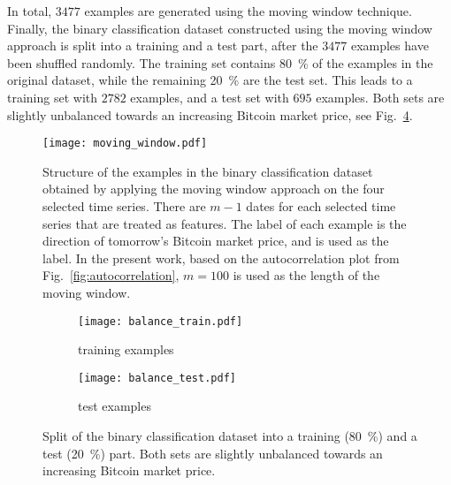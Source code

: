 In total, $3477$ examples are generated using the moving window technique. \\

Finally, the binary classification dataset constructed using the moving window approach is split into a training and a test part, after the $3477$ examples have been shuffled randomly. The training set contains \SI{80}{\percent} of the examples in the original dataset, while the remaining \SI{20}{\percent} are the test set. This leads to a training set with $2782$ examples, and a test set with $695$ examples. Both sets are slightly unbalanced towards an increasing Bitcoin market price, see Fig.~\ref{fig:test}.

\begin{figure}[h!]
	\centering
	\texttt{[image: moving\_window.pdf]}
    \caption{Structure of the examples in the binary classification dataset obtained by applying the moving window approach on the four selected time series. There are $m-1$ dates for each selected time series that are treated as features. The label of each example is the direction of tomorrow's Bitcoin market price, and is used as the label. In the present work, based on the autocorrelation plot from Fig.~\ref{fig:autocorrelation}, $m=100$ is used as the length of the moving window.}
    \label{fig:example}
\end{figure}

\begin{figure}[h!]
\centering
\begin{subfigure}{.5\textwidth}
  \centering
  \texttt{[image: balance\_train.pdf]}
  \caption{training examples}
  \label{fig:sub1}
\end{subfigure}%
\begin{subfigure}{.5\textwidth}
  \centering
  \texttt{[image: balance\_test.pdf]}
  \caption{test examples}
  \label{fig:sub2}
\end{subfigure}
\caption{Split of the binary classification dataset into a training (\SI{80}{\percent}) and a test (\SI{20}{\percent}) part. Both sets are slightly unbalanced towards an increasing Bitcoin market price.}
\label{fig:test}
\end{figure}